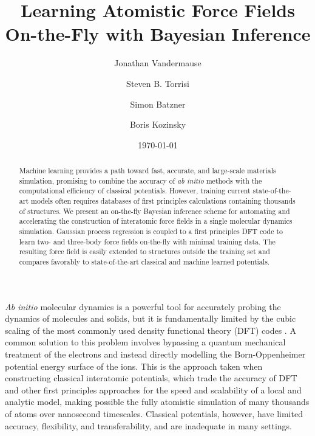 \documentclass[%
reprint,
superscriptaddress,
amsmath,amssymb,
aps,
prl,
]{revtex4-1}
\begin{document}
\title{Learning Atomistic Force Fields On-the-Fly with Bayesian Inference}

\author{Jonathan Vandermause}

\author{Steven B. Torrisi}

\author{Simon Batzner}

\author{Boris Kozinsky}


\date{\today}

\begin{abstract}
  Machine learning provides a path toward fast, accurate, and large-scale materials simulation, promising to combine the accuracy of \textit{ab initio} methods with the computational efficiency of classical potentials. However, training current state-of-the-art models often requires databases of first principles calculations containing thousands of structures. We present an on-the-fly Bayesian inference scheme for automating and accelerating the construction of interatomic force fields in a single molecular dynamics simulation. Gaussian process regression is coupled to a first principles DFT code to learn two- and three-body force fields on-the-fly with minimal training data. The resulting force field is easily extended to structures outside the training set and compares favorably to state-of-the-art classical and machine learned potentials.
\end{abstract}

\maketitle

\textit{Ab initio} molecular dynamics is a powerful tool for
accurately probing the dynamics of molecules and solids, but it is fundamentally limited by the cubic scaling of the most commonly used density functional theory (DFT) codes \cite{kohn1999nobel}. A common solution to this problem involves bypassing a quantum mechanical treatment of the electrons and instead directly modelling the Born-Oppenheimer potential energy surface of the ions. This is the approach taken when constructing classical interatomic potentials, which trade the accuracy of DFT and other first principles approaches for the speed and scalability of a local and analytic model, making possible the fully atomistic simulation of many thousands of atoms over nanosecond timescales. Classical potentials, however, have limited accuracy, flexibility, and transferability, and are inadequate in many settings.
\end{document}
